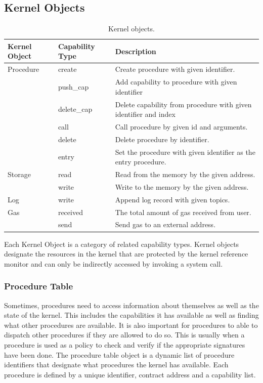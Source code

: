 \documentclass[english,a4paper]{article}
\let\oldparagraph\subsubsection
\renewcommand{\subsubsection}[1]{\oldparagraph{#1}\mbox{}}
\begin{document}
\subsection{Kernel Objects}\label{kernel-objects}
\begin{table}[H]
    \caption{Kernel objects.}
    \centering{}%
    \begin{tabular}{l|l|p{}}


        \hline
        Kernel Object & Capability Type & Description\tabularnewline
        \hline
        \hline
        Procedure & create & Create procedure with given
        identifier.\tabularnewline
        & push\_cap & Add capability to procedure with given
        identifier\tabularnewline
        & delete\_cap & Delete capability from procedure with given identifier
        and index\tabularnewline
        & call & Call procedure by given id and arguments.\tabularnewline
        & delete & Delete procedure by identifier.\tabularnewline
        & entry & Set the procedure with given identifier as the entry
        procedure.\tabularnewline
        \hline
        Storage & read & Read from the memory by the given
        address.\tabularnewline
        & write & Write to the memory by the given address.\tabularnewline
        \hline
        Log & write & Append log record with given topics.\tabularnewline
        \hline
        Gas & received & The total amount of gas received from
        user.\tabularnewline
        & send & Send gas to an external address.\tabularnewline
        \hline
    \end{tabular}
\end{table}

Each Kernel Object is a category of related capability types. Kernel
objects designate the resources in the kernel that are protected by the
kernel reference monitor and can only be indirectly accessed by invoking
a system call.

\subsubsection{Procedure Table}\label{procedure-table}
Sometimes, procedures need to access information about themselves as
well as the state of the kernel. This includes the capabilities it has
available as well as finding what other procedures are available. It is
also important for procedures to able to dispatch other procedures if
they are allowed to do so. This is usually when a procedure is used as a
policy to check and verify if the appropriate signatures have been done.
The procedure table object is a dynamic list of procedure identifiers
that designate what procedures the kernel has available. Each procedure
is defined by a unique identifier, contract address and a capability
list.
\end{document}
